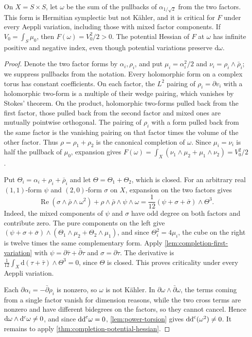 \begin{example}\label{ex:torus-completion-critical}
On $X=S\times S$, let $\omega$ be the sum of the pullbacks of $\alpha_{1/\sqrt2}$ from the two factors. This form is Hermitian symplectic but not K\"ahler, and it is critical for $F$ under every Aeppli variation, including those with mixed factor components. If $V_0=\int_S\mu_0$, then $F(\omega)=V_0^2/2>0$. The potential Hessian of $F$ at $\omega$ has infinite positive and negative index, even though potential variations preserve $\mathrm d\omega$.
\end{example}
\begin{proof}
Denote the two factor forms by $\alpha_i,\rho_i$, and put $\mu_i=\alpha_i^2/2$ and $\nu_i=\rho_i\wedge\bar\rho_i$; we suppress pullbacks from the notation. Every holomorphic form on a complex torus has constant coefficients. On each factor, the $L^2$ pairing of $\rho_i=\partial v_i$ with a holomorphic two-form is a multiple of their wedge pairing, which vanishes by Stokes' theorem. On the product, holomorphic two-forms pulled back from the first factor, those pulled back from the second factor and mixed ones are mutually pointwise orthogonal. The pairing of $\rho_i$ with a form pulled back from the same factor is the vanishing pairing on that factor times the volume of the other factor. Thus $\rho=\rho_1+\rho_2$ is the canonical completion of $\omega$. Since $\mu_i=\nu_i$ is half the pullback of $\mu_0$, expansion gives $F(\omega)=\int_X(\nu_1\wedge\mu_2+\mu_1\wedge\nu_2)=V_0^2/2$.

Put $\Theta_i=\alpha_i+\rho_i+\bar\rho_i$ and let $\Theta=\Theta_1+\Theta_2$, which is closed. For an arbitrary real $(1,1)$-form $\psi$ and $(2,0)$-form $\sigma$ on $X$, expansion on the two factors gives
\[
 \operatorname{Re}(\sigma\wedge\bar\rho\wedge\omega^2)
   +\rho\wedge\bar\rho\wedge\psi\wedge\omega
 =\frac1{12}(\psi+\sigma+\bar\sigma)\wedge\Theta^3.
\]
Indeed, the mixed components of $\psi$ and $\sigma$ have odd degree on both factors and contribute zero. The pure components on the left give $(\psi+\sigma+\bar\sigma)\wedge(\Theta_1\wedge\mu_2+\Theta_2\wedge\mu_1)$, and since $\Theta_i^2=4\mu_i$, the cube on the right is twelve times the same complementary form. Apply \cref{lem:completion-first-variation} with $\psi=\partial\bar\tau+\bar\partial\tau$ and $\sigma=\partial\tau$. The derivative is $\frac1{12}\int_X\mathrm d(\tau+\bar\tau)\wedge\Theta^3=0$, since $\Theta$ is closed. This proves criticality under every Aeppli variation.

Each $\partial\alpha_i=-\bar\partial\rho_i$ is nonzero, so $\omega$ is not K\"ahler. In $\partial\omega\wedge\bar\partial\omega$, the terms coming from a single factor vanish for dimension reasons, while the two cross terms are nonzero and have different bidegrees on the factors, so they cannot cancel. Hence $\mathrm d\omega\wedge\mathrm d^{\mathrm c}\omega\ne0$, and since $\mathrm{dd}^{\mathrm{c}}\omega=0$, \cref{lem:power-torsion} gives $\mathrm{dd}^{\mathrm{c}}(\omega^2)\ne0$. It remains to apply \cref{thm:completion-potential-hessian}.
\end{proof}


